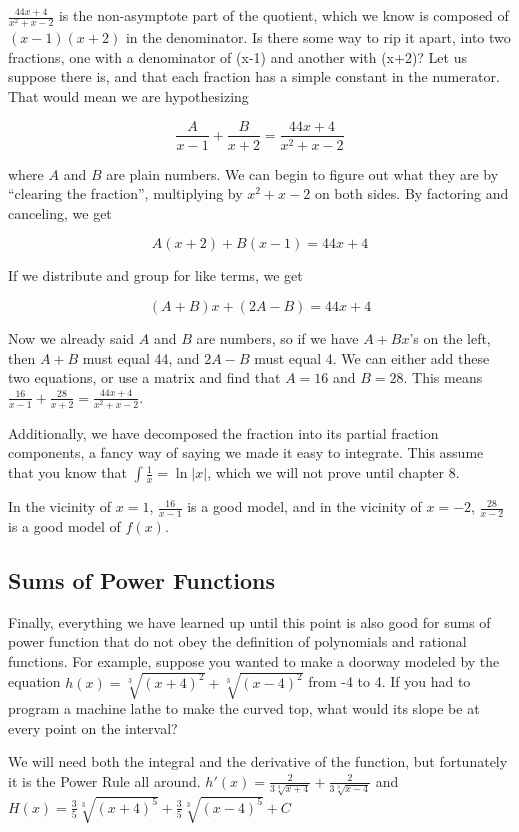$\frac{44x+4}{x^2+x-2}$ is the non-asymptote part of the quotient, which we know is 
composed of $(x-1)(x+2)$ in the denominator.  Is there some way to rip it apart, into
two fractions, one with a denominator of (x-1) and another with (x+2)?  Let us suppose
there is, and that each fraction has a simple constant in the numerator.  That would
mean we are hypothesizing

$$
\frac{A}{x-1} + \frac{B}{x+2} = \frac{44x+4}{x^2+x-2}
$$

where $A$ and $B$ are plain numbers.  We can begin to figure out what they are by
``clearing the fraction'', multiplying by $x^2+x-2$ on both sides.  By factoring and canceling,
we get

$$
A(x+2) + B(x-1) = 44x + 4
$$

If we distribute and group for like terms, we get

$$
(A+B)x + (2A-B) = 44x + 4
$$

Now we already said $A$ and $B$ are numbers, so if we have $A+B x$'s on the left,
then $A+B$ must equal 44, and $2A-B$ must equal 4.  We can either add these two 
equations, or use a matrix and find that $A=16$ and $B=28$.  This means $\frac{16}{x-1}
+ \frac{28}{x+2} = \frac{44x+4}{x^2+x-2}$.

Additionally, we have decomposed the fraction into its partial fraction components,
a fancy way of saying we made it easy to integrate.  This assume that you know that
$\int \frac{1}{x} = \ln{|x|}$, which we will not prove until chapter 8.

In the vicinity of $x=1$, $\frac{16}{x-1}$ is a good model, and in the vicinity of $x=-2$,
$\frac{28}{x-2}$ is a good model of $f(x)$.


\subsection{Sums of Power Functions}
Finally, everything we have learned up until this point is also good for sums of 
power function that do not obey the definition of polynomials and rational functions.
For example, suppose you wanted to make a doorway modeled by the equation
$h(x) = \sqrt[3]{(x+4)^2}+\sqrt[3]{(x-4)^2}$ from -4 to 4.  If you had to program a 
machine lathe to make the curved top, what would its slope be at every point
on the interval?

We will need both the integral and the derivative of the function, but fortunately
it is the Power Rule all around.  $h'(x) = \frac{2}{3\sqrt[3]{x+4}}+\frac{2}{3\sqrt[3]{x-4}}$
and $H(x) = \frac{3}{5}\sqrt[3]{(x+4)^5}+\frac{3}{5}\sqrt[3]{(x-4)^5}+C$
